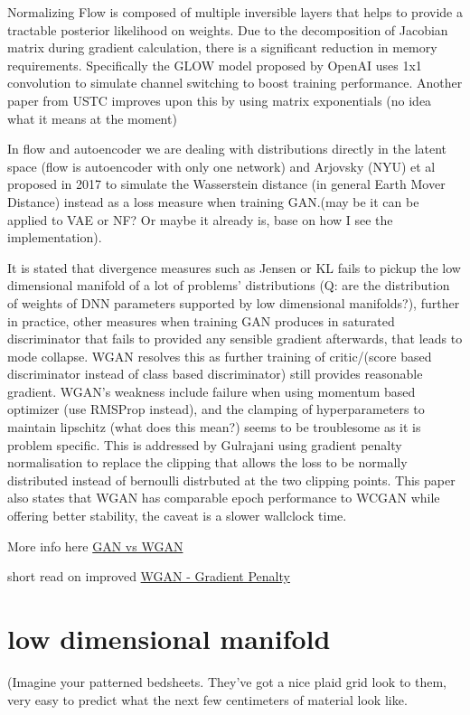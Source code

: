 \documentclass[honours,12pt]{unswthesis}
\numberwithin{equation}{section}
\begin{document}
Normalizing Flow is composed of multiple inversible layers that helps to provide a tractable posterior likelihood on weights. Due to the decomposition of Jacobian matrix during gradient calculation, there is a significant reduction in memory requirements. Specifically the GLOW model proposed by OpenAI \cite{openai2018glow} uses 1x1 convolution to simulate channel switching to boost training performance. Another paper from USTC improves upon this by using matrix exponentials (no idea what it means at the moment)

In flow and autoencoder we are dealing with distributions directly in the latent space (flow is autoencoder with only one network) and Arjovsky (NYU) \cite{PMLR2017_WGAN} et al proposed in 2017 to simulate the Wasserstein distance (in general Earth Mover Distance) instead as a loss measure when training GAN.(may be it can be applied to VAE or NF? Or maybe it already is, base on how I see the implementation). 

It is stated that divergence measures such as Jensen or KL fails to pickup the low dimensional manifold of a lot of problems' distributions (Q: are the distribution of weights of DNN parameters supported by low dimensional manifolds?), further in practice, other measures when training GAN produces in saturated discriminator that fails to provided any sensible gradient afterwards, that leads to mode collapse. WGAN resolves this as further training of critic/(score based discriminator instead of class based discriminator) still provides reasonable gradient. WGAN's weakness include failure when using momentum based optimizer (use RMSProp instead), and the clamping of hyperparameters to maintain lipschitz (what does this mean?) seems to be troublesome as it is problem specific. This is addressed by Gulrajani \cite{NIPS2017_WGAN-GP} using gradient penalty normalisation to replace the clipping that allows the loss to be normally distributed instead of bernoulli distrbuted at the two clipping points. This paper also states that WGAN has comparable epoch performance to WCGAN while offering better stability, the caveat is a slower wallclock time. 

More info here \href{https://lilianweng.github.io/lil-log/2017/08/20/from-GAN-to-WGAN.html}{GAN vs WGAN}

short read on improved \href{https://towardsdatascience.com/demystified-wasserstein-gan-with-gradient-penalty-ba5e9b905ead}{WGAN - Gradient Penalty}

\section{low dimensional manifold}
(Imagine your patterned bedsheets. They've got a nice plaid grid look to them, very easy to predict what the next few centimeters of material look like.
\end{document}

